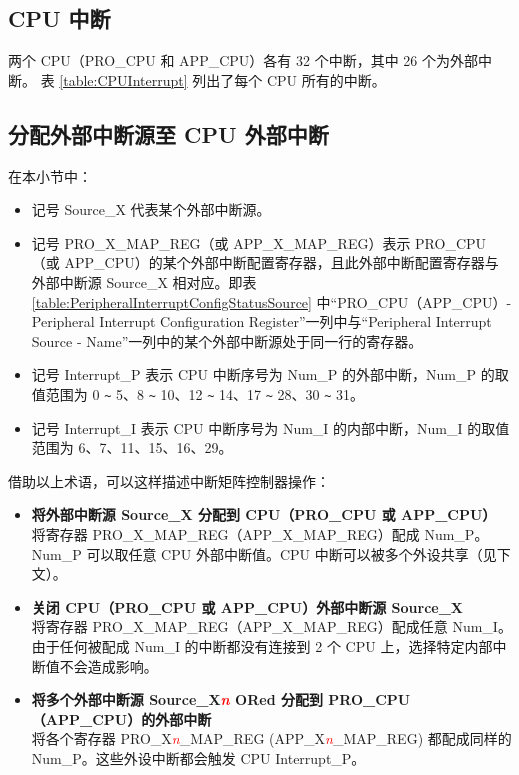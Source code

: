 \documentclass[main\_\_CN.tex]{subfiles}
\begin{document}



\subsection{CPU 中断}

两个 CPU（PRO\_CPU 和 APP\_CPU）各有 32 个中断，其中 26 个为外部中断。
表 \ref{table:CPUInterrupt} 列出了每个 CPU 所有的中断。




\subsection{分配外部中断源至 CPU 外部中断}

在本小节中：
\begin{itemize}

\item 记号 Source\_X 代表某个外部中断源。
\item 记号 PRO\_X\_MAP\_REG（或 APP\_X\_MAP\_REG）表示 PRO\_CPU（或 APP\_CPU）的某个外部中断配置寄存器，且此外部中断配置寄存器与外部中断源 Source\_X 相对应。即表 \ref{table:PeripheralInterruptConfigStatusSource} 中“PRO\_CPU（APP\_CPU）- Peripheral Interrupt Configuration Register”一列中与“Peripheral Interrupt Source - Name”一列中的某个外部中断源处于同一行的寄存器。
\item 记号 Interrupt\_P 表示 CPU 中断序号为 Num\_P 的外部中断，Num\_P 的取值范围为 0 \verb+~+ 5、8 \verb+~+ 10、12 \verb+~+ 14、17 \verb+~+ 28、30 \verb+~+ 31。
\item 记号 Interrupt\_I 表示 CPU 中断序号为 Num\_I 的内部中断，Num\_I 的取值范围为 6、7、11、15、16、29。
\end{itemize}
借助以上术语，可以这样描述中断矩阵控制器操作：
\begin{itemize}
\item \textbf{将外部中断源 Source\_X 分配到 CPU（PRO\_CPU 或 APP\_CPU）}\\
将寄存器 PRO\_X\_MAP\_REG（APP\_X\_MAP\_REG）配成 Num\_P。Num\_P 可以取任意 CPU 外部中断值。CPU 中断可以被多个外设共享（见下文）。

\item \textbf{关闭 CPU（PRO\_CPU 或 APP\_CPU）外部中断源 Source\_X}\\
将寄存器 PRO\_X\_MAP\_REG（APP\_X\_MAP\_REG）配成任意 Num\_I。由于任何被配成 Num\_I 的中断都没有连接到 2 个 CPU 上，选择特定内部中断值不会造成影响。

\item \textbf{将多个外部中断源 Source\_X\textcolor{red}{\it{n}} ORed 分配到 PRO\_CPU（APP\_CPU）的外部中断}\\
将各个寄存器 PRO\_X\textcolor{red}{\it{n}}\_MAP\_REG (APP\_X\textcolor{red}{\it{n}}\_MAP\_REG) 都配成同样的 Num\_P。这些外设中断都会触发 CPU Interrupt\_P。
\end{itemize}
\end{document}

